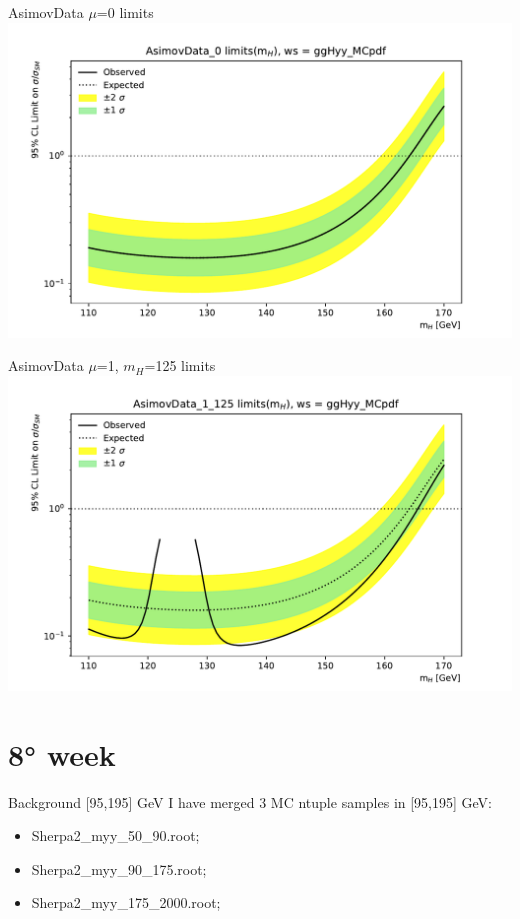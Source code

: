 \documentclass[10pt,UKenglish, leqno, xcolor = dvipsnames]{beamer}
\begin{document}
		\begin{frame}{AsimovData $\mu$=0 limits}
			\vfill
			\includegraphics[width=1.\textwidth]{../images/plot_AsimovData_0_ggHyy_MCpdf.pdf}
			\vfill
		\end{frame}
			
		\begin{frame}{AsimovData $\mu$=1, $m_H$=125 limits}
			\vfill
			\includegraphics[width=1.\textwidth]{../images/plot_AsimovData_1_125_ggHyy_MCpdf.pdf}
			\vfill
		\end{frame}
	
	\section{8° week}
	\SectionPage
	
		\begin{frame}{Background [95,195] GeV}
			\vfill
			I have merged 3 MC ntuple samples in [95,195] GeV:
			\begin{itemize}
				\item Sherpa2\_myy\_50\_90.root;
				\item Sherpa2\_myy\_90\_175.root;
				\item Sherpa2\_myy\_175\_2000.root;
			\end{itemize}
			\vfill
		\end{frame}
	
\end{document}
